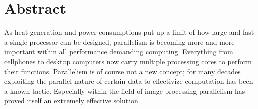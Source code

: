\begingroup
\let\clearpage\relax
\let\cleardoublepage\relax
\let\cleardoublepage\relax

\chapter*{Abstract}





As heat generation and power consumptions put up a limit of how large and fast a
single processor can be designed, parallelism is becoming more and more
important within all performance demanding computing. Everything from cellphones
to desktop computers now carry multiple processing cores to perform their
functions. Parallelism is of course not a new concept; for many decades
exploiting the parallel nature of certain data to effectivize computation has
been a known tactic. Especially within the field of image processing parallelism
has proved itself an extremely effective solution.

